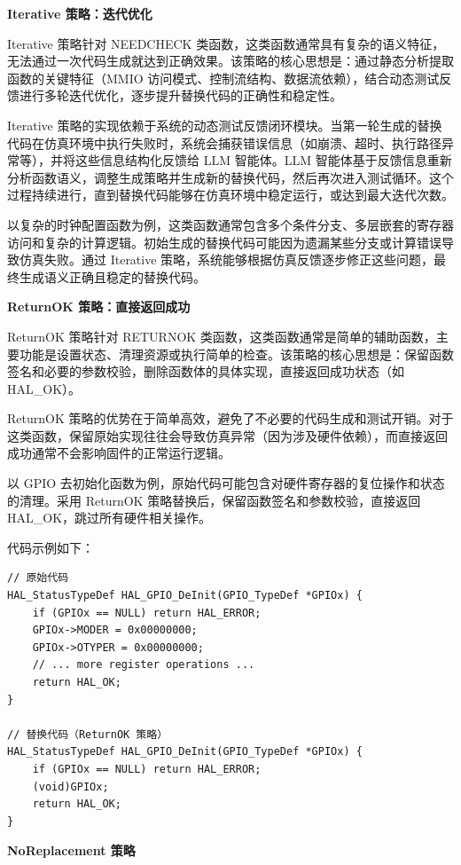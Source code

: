 \textbf{Iterative 策略：迭代优化}

Iterative 策略针对 NEEDCHECK 类函数，这类函数通常具有复杂的语义特征，无法通过一次代码生成就达到正确效果。该策略的核心思想是：通过静态分析提取函数的关键特征（MMIO 访问模式、控制流结构、数据流依赖），结合动态测试反馈进行多轮迭代优化，逐步提升替换代码的正确性和稳定性。

Iterative 策略的实现依赖于系统的动态测试反馈闭环模块。当第一轮生成的替换代码在仿真环境中执行失败时，系统会捕获错误信息（如崩溃、超时、执行路径异常等），并将这些信息结构化反馈给 LLM 智能体。LLM 智能体基于反馈信息重新分析函数语义，调整生成策略并生成新的替换代码，然后再次进入测试循环。这个过程持续进行，直到替换代码能够在仿真环境中稳定运行，或达到最大迭代次数。

以复杂的时钟配置函数为例，这类函数通常包含多个条件分支、多层嵌套的寄存器访问和复杂的计算逻辑。初始生成的替换代码可能因为遗漏某些分支或计算错误导致仿真失败。通过 Iterative 策略，系统能够根据仿真反馈逐步修正这些问题，最终生成语义正确且稳定的替换代码。

\textbf{ReturnOK 策略：直接返回成功}

ReturnOK 策略针对 RETURNOK 类函数，这类函数通常是简单的辅助函数，主要功能是设置状态、清理资源或执行简单的检查。该策略的核心思想是：保留函数签名和必要的参数校验，删除函数体的具体实现，直接返回成功状态（如 HAL\_OK）。

ReturnOK 策略的优势在于简单高效，避免了不必要的代码生成和测试开销。对于这类函数，保留原始实现往往会导致仿真异常（因为涉及硬件依赖），而直接返回成功通常不会影响固件的正常运行逻辑。

以 GPIO 去初始化函数为例，原始代码可能包含对硬件寄存器的复位操作和状态的清理。采用 ReturnOK 策略替换后，保留函数签名和参数校验，直接返回 HAL\_OK，跳过所有硬件相关操作。

代码示例如下：

\begin{lstlisting}[style=CStyle,abovecaptionskip=0pt,belowcaptionskip=0pt]
// 原始代码
HAL_StatusTypeDef HAL_GPIO_DeInit(GPIO_TypeDef *GPIOx) {
    if (GPIOx == NULL) return HAL_ERROR;
    GPIOx->MODER = 0x00000000;
    GPIOx->OTYPER = 0x00000000;
    // ... more register operations ...
    return HAL_OK;
}

// 替换代码（ReturnOK 策略）
HAL_StatusTypeDef HAL_GPIO_DeInit(GPIO_TypeDef *GPIOx) {
    if (GPIOx == NULL) return HAL_ERROR;
    (void)GPIOx;
    return HAL_OK;
}
\end{lstlisting}

\textbf{NoReplacement 策略}

